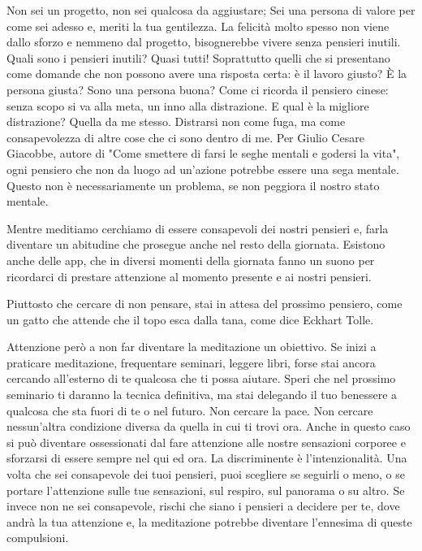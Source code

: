 \documentclass[12pt]{book} %
\begin{document}
Non sei un progetto, non sei qualcosa da aggiustare; Sei una persona di valore per come sei adesso e, meriti la tua gentilezza. 
La felicità molto spesso non viene dallo sforzo e nemmeno dal progetto, bisognerebbe vivere senza pensieri inutili. Quali sono i pensieri inutili? Quasi tutti! Soprattutto quelli che si presentano come domande che  non possono avere una risposta certa: è il lavoro giusto? È la persona giusta? Sono una persona buona? Come ci ricorda il pensiero cinese: senza scopo si va alla meta, un inno alla distrazione. E qual è la migliore distrazione? Quella da me stesso. 
Distrarsi non come fuga, ma come consapevolezza di altre cose che ci sono dentro di me.
Per Giulio Cesare Giacobbe, autore di "Come smettere di farsi le seghe mentali e godersi la vita", ogni pensiero che non da luogo ad un'azione potrebbe essere una sega mentale. Questo non è necessariamente un problema, se non peggiora il nostro stato mentale. 

Mentre meditiamo cerchiamo di essere consapevoli dei nostri pensieri e, farla diventare un abitudine che prosegue anche nel resto della giornata.
Esistono anche delle app, che in diversi momenti della giornata fanno un suono per ricordarci di prestare attenzione al momento presente e ai nostri pensieri. 

Piuttosto che cercare di non pensare, stai in attesa del prossimo pensiero, come un gatto che attende che il topo esca dalla tana, come dice Eckhart Tolle.

Attenzione però a non far diventare la meditazione un obiettivo. Se inizi a praticare meditazione, frequentare seminari,
leggere libri, forse stai ancora cercando all'esterno di te qualcosa che ti
possa aiutare. Speri che nel prossimo seminario ti daranno la tecnica definitiva, ma stai delegando il tuo benessere a
qualcosa che sta fuori di te o nel futuro. Non cercare la pace. Non cercare nessun'altra
condizione diversa da quella in cui ti trovi ora. Anche in questo caso si può diventare ossessionati dal fare
attenzione alle nostre sensazioni corporee e sforzarsi di essere sempre nel qui ed ora. 
La discriminente è l'intenzionalità. Una volta che sei consapevole dei tuoi pensieri, puoi scegliere se seguirli o meno, o se portare l'attenzione sulle tue sensazioni, sul respiro, sul panorama o su altro. Se invece non ne sei consapevole, rischi che siano i pensieri a
decidere per te, dove andrà la tua attenzione e, la meditazione potrebbe diventare l'ennesima di queste compulsioni.
\end{document}
